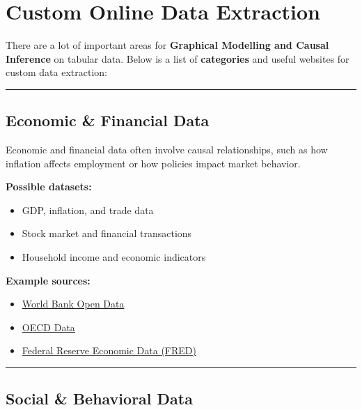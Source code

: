 \documentclass[
  letterpaper,
  DIV=11,
  numbers=noendperiod]{scrreprt}
\begin{document}

\chapter{Custom Online Data
Extraction}\label{custom-online-data-extraction}

There are a lot of important areas for \textbf{Graphical Modelling and
Causal Inference} on tabular data. Below is a list of
\textbf{categories} and useful websites for custom data extraction:

\begin{center}\rule{0.5\linewidth}{0.5pt}\end{center}

\section{\texorpdfstring{\textbf{Economic \& Financial
Data}}{Economic \& Financial Data}}\label{economic-financial-data}

Economic and financial data often involve causal relationships, such as
how inflation affects employment or how policies impact market behavior.

\textbf{Possible datasets:}

\begin{itemize}
\item
  GDP, inflation, and trade data
\item
  Stock market and financial transactions
\item
  Household income and economic indicators
\end{itemize}

\textbf{Example sources:}

\begin{itemize}
\item
  \href{https://data.worldbank.org/}{World Bank Open Data}
\item
  \href{https://www.oecd.org/en/data.html}{OECD Data}
\item
  \href{https://fred.stlouisfed.org/}{Federal Reserve Economic Data
  (FRED)}
\end{itemize}

\begin{center}\rule{0.5\linewidth}{0.5pt}\end{center}

\section{\texorpdfstring{\textbf{Social \& Behavioral
Data}}{Social \& Behavioral Data}}\label{social-behavioral-data}
\end{document}
